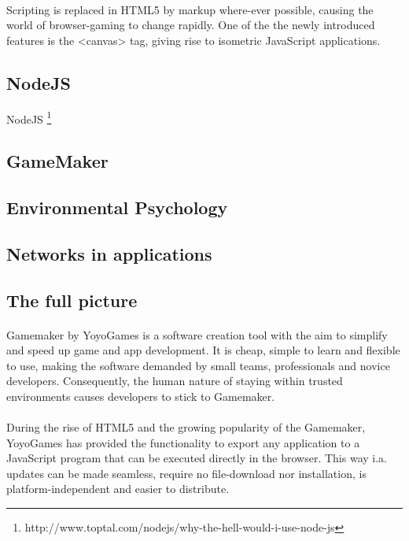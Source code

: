 \documentclass[12pt]{article}
\begin{document}
\paragraph{}Scripting is replaced in HTML5 by markup where-ever possible, causing the world of browser-gaming to change rapidly. One of the the newly introduced features is the <canvas> tag, giving rise to isometric JavaScript applications.


\subsection{NodeJS}
NodeJS \footnote{http://www.toptal.com/nodejs/why-the-hell-would-i-use-node-js}
\paragraph{}

\subsection{GameMaker}
\subsection{Environmental Psychology}
\subsection{Networks in applications}
\subsection{The full picture}
\paragraph{}Gamemaker by YoyoGames is a software creation tool with the aim to simplify and speed up game and app development. It is cheap, simple to learn and flexible to use, making the software demanded by small teams, professionals and novice developers. Consequently, the human nature of staying within trusted environments causes developers to stick to Gamemaker.

\paragraph{}During the rise of HTML5 and the growing popularity of the Gamemaker, YoyoGames has provided the functionality to export any application to a JavaScript program that can be executed directly in the browser. This way i.a. updates can be made seamless, require no file-download nor installation, is platform-independent and easier to distribute.
\end{document}
